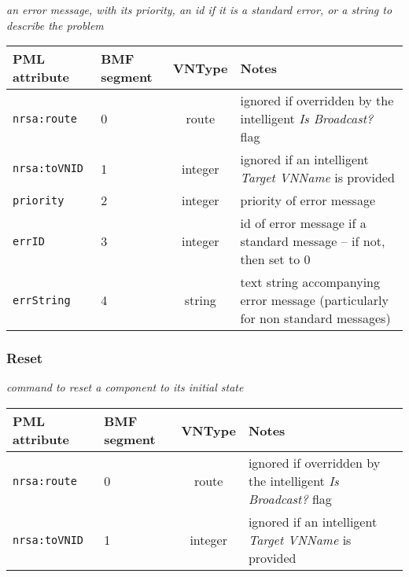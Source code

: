 \documentclass[pdftex,a4paper]{article}
\newcommand{\XMLfont}[1]{{\tt \small #1}}
\begin{document}
{\em an error message, with its priority, an id if it is a standard
  error, or a string to describe the problem}

\begin{table}[!h]
  \begin{center}
    \label{tab:Error}
    \begin{tabular}{|l|p{13mm}|c|p{60mm}|}
      \hline

      \textbf{PML attribute} & \textbf{BMF segment} & \textbf{VNType}
      & \textbf{Notes} \\\hline

      \XMLfont{nrsa:route} & 0 & route & ignored if overridden by the
      intelligent {\em Is Broadcast?} flag \\\hline

      \XMLfont{nrsa:toVNID} & 1 & integer & ignored if an intelligent
      {\em Target VNName} is provided \\\hline

      \XMLfont{priority} & 2 & integer & priority of error
      message
      \\\hline

      \XMLfont{errID} & 3 & integer & id of error message if a
      standard message -- if not, then set to 0 \\\hline

      \XMLfont{errString} & 4 & string & text string accompanying
      error message (particularly for non standard messages) \\\hline

    \end{tabular}
  \end{center}
\end{table}

\clearpage

\subsubsection{Reset}
{\em command to reset a component to its initial state}

\begin{table}[!h]
  \begin{center}
    \label{tab:Error}
    \begin{tabular}{|l|p{13mm}|c|p{60mm}|}
      \hline

      \textbf{PML attribute} & \textbf{BMF segment} & \textbf{VNType}
      & \textbf{Notes} \\\hline

      \XMLfont{nrsa:route} & 0 & route & ignored if overridden by the
      intelligent {\em Is Broadcast?} flag \\\hline

      \XMLfont{nrsa:toVNID} & 1 & integer & ignored if an intelligent
      {\em Target VNName} is provided \\\hline

    \end{tabular}
  \end{center}
\end{table}
\end{document}
